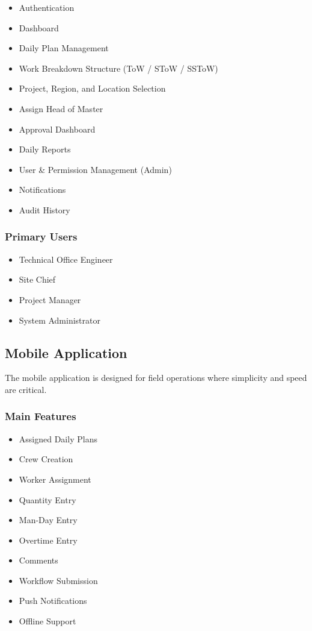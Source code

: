 \documentclass[11pt]{article}
\begin{document}
\begin{itemize}
    \item Authentication
    \item Dashboard
    \item Daily Plan Management
    \item Work Breakdown Structure (ToW / SToW / SSToW)
    \item Project, Region, and Location Selection
    \item Assign Head of Master
    \item Approval Dashboard
    \item Daily Reports
    \item User \& Permission Management (Admin)
    \item Notifications
    \item Audit History
\end{itemize}

\subsubsection*{Primary Users}

\begin{itemize}
    \item Technical Office Engineer
    \item Site Chief
    \item Project Manager
    \item System Administrator
\end{itemize}

\subsection{Mobile Application}

The mobile application is designed for field operations where simplicity and
speed are critical.

\subsubsection*{Main Features}

\begin{itemize}
    \item Assigned Daily Plans
    \item Crew Creation
    \item Worker Assignment
    \item Quantity Entry
    \item Man-Day Entry
    \item Overtime Entry
    \item Comments
    \item Workflow Submission
    \item Push Notifications
    \item Offline Support
\end{itemize}
\end{document}
